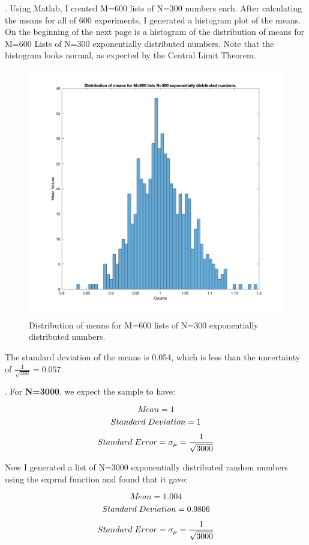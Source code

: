 \documentclass{article}
\begin{document}
.     Using Matlab, I created M=600 lists of N=300 numbers each. After calculating the means for all of 600 experiments, I generated a histogram plot of the means. On the beginning of the next page is a histogram of the distribution of means for M=600 Lists of N=300 exponentially distributed numbers. Note that the histogram looks normal, as expected by the Central Limit Theorem.

 \begin{figure}[H]
  \centering
  \includegraphics[width=0.8\linewidth]{lateximages/Prob4_3.png}
  \caption{Distribution of means for M=600 lists of N=300 exponentially distributed numbers.}
  \label{fig:boat2}
  \end{figure}  
  
    The standard deviation of the means is 0.054, which is less than the uncertainty of $\frac{1}{\sqrt{300}}=0.057$. \newline
  
.   For \textbf{N=3000}, we expect the sample to have:
 
 \[ Mean=1\]
  \[ Standard\hspace{1mm}Deviation=1\]
   \[ Standard\hspace{1mm}Error=\sigma_{\mu}=\frac{1}{\sqrt{3000}}\] 


Now I generated a list of N=3000 exponentially distributed random numbers using the exprnd function and found that it gave:

 \[ Mean=1.004\]
  \[ Standard\hspace{1mm}Deviation=0.9806\]
   \[ Standard\hspace{1mm}Error=\sigma_{\mu}=\frac{1}{\sqrt{3000}}\] 
   
\end{document}
